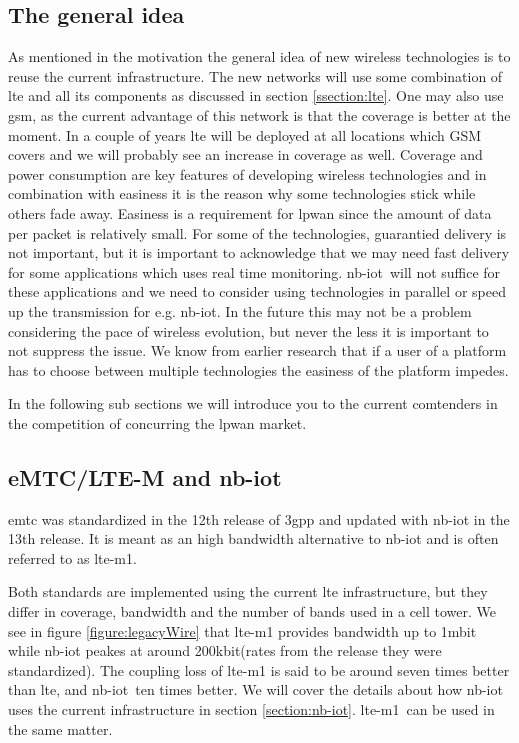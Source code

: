 \documentclass[USenglish]{ifimaster}  %
\begin{document}
\subsection{The general idea}
As mentioned in the motivation the general idea of new wireless technologies is to reuse the current infrastructure. The new networks will use some combination of \acrshort{lte} and all its components as discussed in section \vref{ssection:lte}. One may also use \acrshort{gsm}, as the current advantage of this network is that the coverage is better at the moment. In a couple of years \acrshort{lte} will be deployed at all locations which GSM covers and we will probably see an increase in coverage as well. Coverage and power consumption are key features of developing wireless technologies and in combination with easiness it is the reason why some technologies stick while others fade away. Easiness is a requirement for \acrshort{lpwan} since the amount of data per packet is relatively small. For some of the technologies, guarantied delivery is not important, but it is important to acknowledge that we may need fast delivery for some applications which uses real time monitoring.
\acrshort{nb-iot} will not suffice for these applications and we need to consider using technologies in parallel or speed up the transmission for e.g. \acrshort{nb-iot}. In the future this may not be a problem considering the pace of wireless evolution, but never the less it is important to not suppress the issue. We know from earlier research that if a user of a platform has to choose between multiple technologies the easiness of the platform impedes.

In the following sub sections we will introduce you to the current comtenders in the competition of concurring the \acrshort{lpwan} market.

\subsection{eMTC/LTE-M and \acrshort{nb-iot}}
\acrfull{emtc} was standardized in the 12th release of \acrshort{3gpp} and updated with \acrshort{nb-iot} in the 13th release. It is meant as an high bandwidth alternative to \acrshort{nb-iot} and is often referred to as \acrshort{lte-m1}.

Both standards are implemented using the current \acrshort{lte} infrastructure, but they differ in coverage, bandwidth and the number of bands used in a cell tower. We see in figure \vref{figure:legacyWire} that \acrshort{lte-m1} provides bandwidth up to 1\acrshort{mbit} while \acrshort{nb-iot} peakes at around 200\acrshort{kbit}(rates from the release they were standardized). The coupling loss of \acrshort{lte-m1} is said to be around seven times better than \acrshort{lte}, and \acrshort{nb-iot} ten times better. We will cover the details about how \acrshort{nb-iot} uses the current infrastructure in section \vref{section:nb-iot}. \acrshort{lte-m1} can be used in the same matter.
\end{document}
